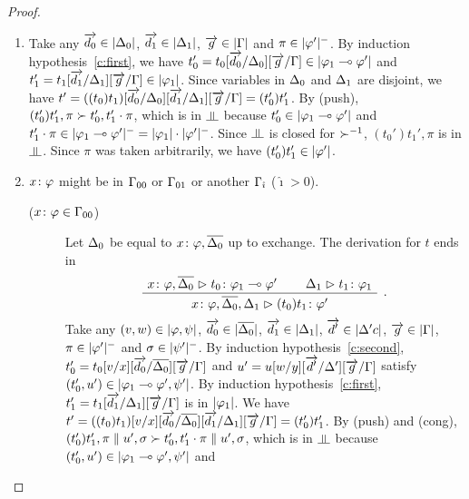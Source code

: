 \begin{proof}
\begin{description}
       \begin{enumerate}[label=\textit{(\arabic{*})}]
	\item {}
	      Take any $\overrightarrow{d_0}\in|{\Delta_0}|$,
	      $\overrightarrow{d_1}\in|{\Delta_1}|$,
	      $\overrightarrow g\in|{\Gamma}|$ and $\pi\in|{\varphi'}|^-$.
	      By induction hypothesis~\ref{c:first}, we have
	      $t_0'=t_0[\overrightarrow{d_0}/\Delta_0][\overrightarrow
	      g/\Gamma]\in|{\varphi_1\multimap\varphi'}|$
	      and
	      $t_1'=t_1[\overrightarrow{d_1}/\Delta_1][\overrightarrow
	      g/\Gamma]\in{|{\varphi_1}|}$.
	      Since variables in $\Delta_0$ and $\Delta_1$ are
	      disjoint, we have
	      $t'=((t_0)t_1)[\overrightarrow{d_0}/\Delta_0][\overrightarrow{d_1}/\Delta_1][\overrightarrow
	      g/\Gamma] = (t_0')t_1'$.
		    By (push), $(t_0')t_1',\pi\succ t_0',t_1'\cdot\pi$,
		    which is in $\bbot$ because
		    $t_0'\in|{\varphi_1\multimap\varphi'}|$ and
		    $t_1'\cdot\pi\in|{\varphi_1\multimap\varphi'}|^- =
		    |{\varphi_1}|\cdot|{\varphi'}|^-$.
		    Since $\bbot$ is closed for $\succ^{-1}$,
		    $(t_0')t_1',\pi$ is in $\bbot$.
		    Since $\pi$ was taken arbitrarily,
		    we have $(t_0')t_1'\in|{\varphi'}|$.
	\item ${x} \colon{\varphi}$ might be in $\Gamma_{00}$ or $\Gamma_{01}$ or another
	      $\Gamma_{\hat\imath}$ ($\hat\imath >0$).
	     \begin{description}
	      \item[(${x} \colon{\varphi}\in\Gamma_{00}$)]
		    Let $\Delta_0$ be equal to ${x} \colon{\varphi},\overline{\Delta_0}$ up
		    to exchange.
		    The derivation for $t$ ends in\[
		    \aseq{\tj{x}{\phi},\overline{\D_0}}{\tj{t_0}{\phi_1\limp\phi'}}
		    \aseq{\D_1}{\tj{t_1}{\phi_1}}
		    \bseq{\tj{x}{\phi},\overline{\D_0},\D_1}{\tj{(t_0)t_1}{\phi'}}
		    \DisplayProof\enspace.
						  \]
		    Take any $(v,w)\in|{\varphi,\psi}|$,
		             $\overrightarrow{d_0}\in|{\overline{\Delta_0}}|$,
		             $\overrightarrow{d_1}\in|{\Delta_1}|$,
		             $\overrightarrow{d'}\in|{\Delta'c}|$,
		             $\overrightarrow g\in|{\Gamma}|$,
		             $\pi\in|{\varphi'}|^-$ and
		             $\sigma\in|{\psi'}|^-$.
		    By induction hypothesis~\ref{c:second},
		    $t_0'=t_0[v/x][\overrightarrow{d_0}/\overline{\Delta_0}][\overrightarrow
		    g/\Gamma]$ and
		    $u' = u[w/y][\overrightarrow{d'}/\Delta'][\overrightarrow g/\Gamma]$ satisfy
		    $(t_0',u')\in|{\varphi_1\multimap\varphi',\psi'}|$.
		    By induction hypothesis~\ref{c:first},
		    $t_1'=t_1[\overrightarrow{d_1}/\Delta_1][\overrightarrow g/\Gamma]$ is in
		    $|{\varphi_1}|$.
		    We have $t' =
		    ((t_0)t_1)[v/x][\overrightarrow{d_0}/\overline{\Delta_0}][\overrightarrow{d_1}/\Delta_1][\overrightarrow
		    g/\Gamma] = (t_0')t_1'$.
		    By (push) and (cong), $(t_0')t_1',\pi\parallel
		    u',\sigma\succ t_0',t_1'\cdot\pi\parallel u',\sigma$,
		    which is in $\bbot$ because
		    $(t_0',u')\in|{\varphi_1\multimap\varphi',\psi'}|$ and

\end{description}
\end{enumerate}
\end{description}
\end{proof}
